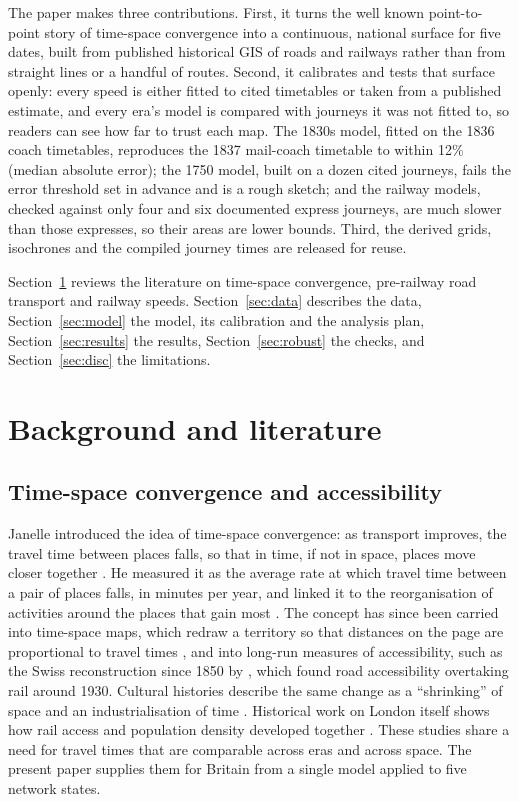 \documentclass[11pt,a4paper]{article}
\begin{document}
The paper makes three contributions. First, it turns the well known point-to-point story of time-space convergence \citep{janelle1968,janelle1969} into a continuous, national surface for five dates, built from published historical GIS of roads and railways rather than from straight lines or a handful of routes. Second, it calibrates and tests that surface openly: every speed is either fitted to cited timetables or taken from a published estimate, and every era's model is compared with journeys it was not fitted to, so readers can see how far to trust each map. The 1830s model, fitted on the 1836 coach timetables, reproduces the 1837 mail-coach timetable to within 12\% (median absolute error); the 1750 model, built on a dozen cited journeys, fails the error threshold set in advance and is a rough sketch; and the railway models, checked against only four and six documented express journeys, are much slower than those expresses, so their areas are lower bounds. Third, the derived grids, isochrones and the compiled journey times are released for reuse.

Section~\ref{sec:lit} reviews the literature on time-space convergence, pre-railway road transport and railway speeds. Section~\ref{sec:data} describes the data, Section~\ref{sec:model} the model, its calibration and the analysis plan, Section~\ref{sec:results} the results, Section~\ref{sec:robust} the checks, and Section~\ref{sec:disc} the limitations.

\section{Background and literature}\label{sec:lit}
\subsection{Time-space convergence and accessibility}
Janelle introduced the idea of time-space convergence: as transport improves, the travel time between places falls, so that in time, if not in space, places move closer together \citep{janelle1968}. He measured it as the average rate at which travel time between a pair of places falls, in minutes per year, and linked it to the reorganisation of activities around the places that gain most \citep{janelle1969}. The concept has since been carried into time-space maps, which redraw a territory so that distances on the page are proportional to travel times \citep{spiekermann1994}, and into long-run measures of accessibility, such as the Swiss reconstruction since 1850 by \citet{axhausen2011}, which found road accessibility overtaking rail around 1930. Cultural histories describe the same change as a ``shrinking'' of space and an industrialisation of time \citep{schivelbusch1986}. Historical work on London itself shows how rail access and population density developed together \citep{levinson2008}. These studies share a need for travel times that are comparable across eras and across space. The present paper supplies them for Britain from a single model applied to five network states.
\end{document}
